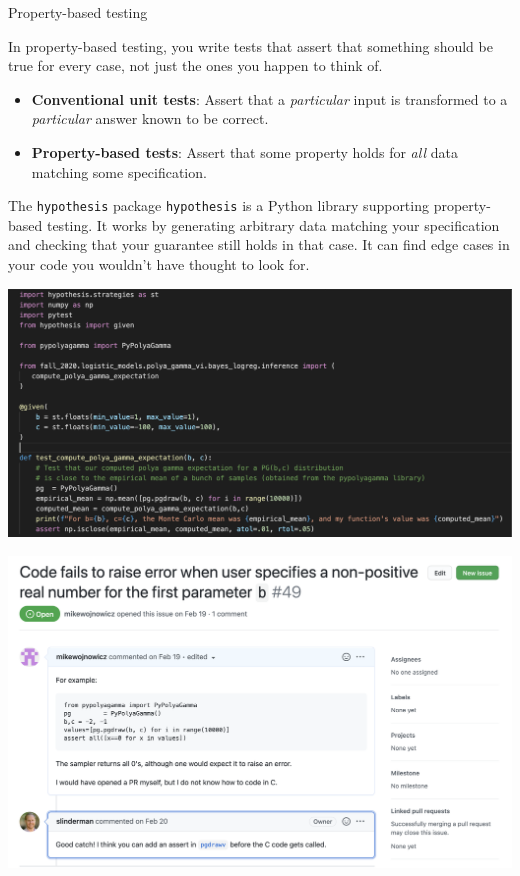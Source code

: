 \documentclass[10pt]{beamer}
\begin{document}
\begin{frame}{Property-based testing}

In \alert{property-based testing}, you write tests that assert that something should be true for every case, not just the ones you happen to think of.
\vfill 
\begin{itemize}
\item \textbf{Conventional unit tests}: Assert that a \textit{particular} input is transformed to a \textit{particular} answer known to be correct.
\item \textbf{Property-based tests}: Assert that some property holds for \textit{all} data matching some specification.
\end{itemize}
\vfill 
\pause 
{}
\begin{block}{The \texttt{hypothesis} package}
\texttt{hypothesis} is a Python library supporting property-based testing.
\vfill
It works by generating arbitrary data matching your specification and checking that your guarantee still holds in that case.
\vfill
It can find edge cases in your code you wouldn’t have thought to look for.
\end{block}
\end{frame}


\begin{frame}
\begin{center}
\includegraphics[width=\textwidth]{images/pypolyagamma_test}	
\end{center}
	
\end{frame}

\begin{frame}
\begin{center}
\includegraphics[width=\textwidth]{images/pypolyagamma_issue}	
\end{center}
	
\end{frame}
\end{document}
